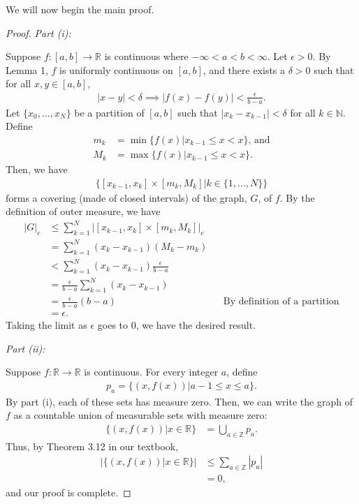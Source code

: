 \documentclass[10pt,a4paper]{article}
\makeatletter
\theoremstyle{theorem}
\newcommand{\proofpart}[2]{%
  \par
  \addvspace{\medskipamount}%
  \noindent\emph{Part #1: #2}\par\nobreak
  \addvspace{\smallskipamount}%
  \@afterheading
}
\theoremstyle{definition}
\makeatother
\begin{document}
We will now begin the main proof.
\begin{proof}
\proofpart{(i)}{}
Suppose $f:[a,b] \to \mathbb{R}$ is continuous where $-\infty < a < b < \infty$. Let $\epsilon > 0$. By Lemma 1, $f$ is uniformly continuous on $[a, b]$, and there exists a $\delta > 0$ such that for all $x, y \in [a, b]$,
\begin{align*}
|x - y| < \delta \implies |f(x) - f(y)| < \frac{\epsilon}{b - a}.
\end{align*}
Let $\{x_0, ..., x_N\}$ be a partition of $[a, b]$ such that $|x_k - x_{k-1}| < \delta$ for all $k \in \mathbb{N}$. Define 
\begin{align*}
m_k &= \min\{f(x)| x_{k-1} \leq x < x\} \text{, and}\\
M_k &= \max\{f(x)| x_{k-1} \leq x < x\}.
\end{align*}
Then, we have
\begin{align*}
\{[x_{k-1}, x_k] \times [m_k, M_k] | k \in \{1, ..., N\} \}
\end{align*}
forms a covering (made of closed intervals) of the graph, $G$, of $f$. By the definition of outer measure, we have
\begin{align*}
|G|_e &\leq \sum_{k=1}^N |[x_{k-1}, x_k] \times [m_k, M_k]|_e\\
&= \sum_{k=1}^N (x_k - x_{k - 1}) (M_k - m_k)\\
&< \sum_{k=1}^N (x_k - x_{k - 1})\frac{\epsilon}{b - a} \\
&= \frac{\epsilon}{b - a}\sum_{k=1}^N (x_k - x_{k - 1})\\
&= \frac{\epsilon}{b - a} (b - a) &&\text{By definition of a partition}\\
&= \epsilon. 
\end{align*}
Taking the limit as $\epsilon$ goes to $0$, we have the desired result.
\proofpart{(ii)}{}
Suppose $f:\mathbb{R} \to \mathbb{R}$ is continuous. For every integer $a$, define 
\begin{align*}
p_a = \{(x, f(x))| a-1 \leq x \leq a\}.
\end{align*}
By part (i), each of these sets has measure zero. Then, we can write the graph of $f$ as a countable union of measurable sets with measure zero:
\begin{align*}
\{(x, f(x)) | x \in \mathbb{R} \} &= \bigcup_{a \in \mathbb{Z}} p_a.
\end{align*}
Thus, by Theorem 3.12 in our textbook,
\begin{align*}
|\{(x, f(x) )| x \in \mathbb{R} \}| &\leq \sum_{a \in \mathbb{Z}} |p_a|\\
&= 0,
\end{align*}
and our proof is complete.
\end{proof}
\end{document}
